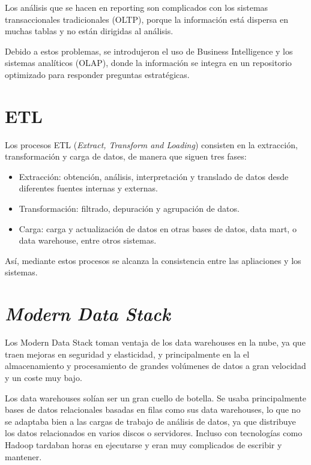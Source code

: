 Los análisis que se hacen en reporting son complicados con los sistemas transaccionales tradicionales (OLTP), porque la información está dispersa en muchas tablas y no están dirigidas al análisis. 

Debido a estos problemas, se introdujeron el uso de Business Intelligence y los sistemas analíticos (OLAP), donde la información se integra en un repositorio optimizado para responder preguntas estratégicas.

\section{ETL}
Los procesos ETL (\emph{Extract, Transform and Loading}) \cite{ETL} consisten en la extracción, transformación y carga de datos, de manera que siguen tres fases:
\begin{itemize}
	\item Extracción: obtención, análisis, interpretación y translado de datos desde diferentes fuentes internas y externas.
	\item Transformación: filtrado, depuración y agrupación de datos.
	\item Carga: carga y actualización de datos en otras bases de datos, data mart, o data warehouse, entre otros sistemas.
	

\end{itemize}
Así, mediante estos procesos se alcanza la consistencia entre las apliaciones y los sistemas.



\section{\emph{Modern Data Stack}}
Los Modern Data Stack \cite{Modern_Data_Stack}toman ventaja de los data warehouses en la nube, ya que traen mejoras en seguridad y elasticidad, y principalmente en la el almacenamiento y procesamiento de grandes volúmenes de datos a gran velocidad y un coste muy bajo.

Los data warehouses solían ser un gran cuello de botella. Se usaba principalmente bases de datos relacionales basadas en filas como sus data warehouses, lo que no se adaptaba bien a las cargas de trabajo de análisis de datos, ya que distribuye los datos relacionados en varios discos o servidores. Incluso con tecnologías como Hadoop tardaban horas en ejecutarse y eran muy complicados de escribir y mantener. 

